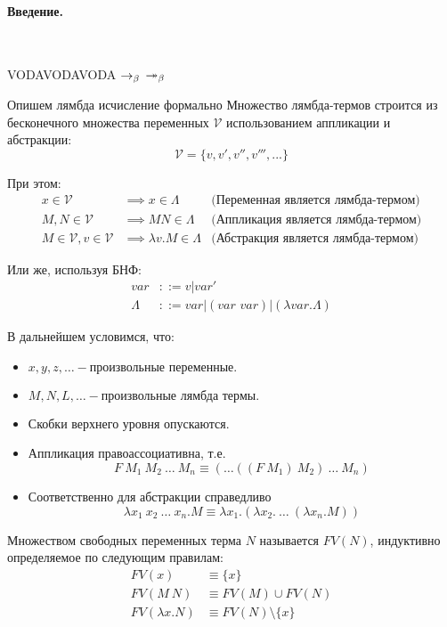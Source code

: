 \documentclass[lambda.tex]{subfiles}
\begin{document}
\paragraph{Введение.} ~\\

\begin{tcolorbox}
VODAVODAVODA
$\rightarrow_\beta$
$\twoheadrightarrow_\beta$
\end{tcolorbox}

Опишем лямбда исчисление формально
Множество лямбда-термов строится из бесконечного множества переменных $\mathcal{V}$ использованием аппликации и абстракции:
\[\mathcal{V} = \{ v, v', v'', v''', ... \}\]

При этом:
\begin{align*}
x \in \mathcal{V} & \implies x \in \Lambda & \text{(Переменная является лямбда-термом)}\\
M, N \in \mathcal{V} & \implies M N \in \Lambda & \text{(Аппликация является лямбда-термом)}\\
M \in \mathcal{V}, v \in \mathcal{V} & \implies \lambda v.M \in \Lambda & \text{(Абстракция является лямбда-термом)}
\end{align*}

Или же, используя БНФ:
\begin{align*}
var &::= v|var'\\
\Lambda &::= var | (\textit{var var}) | ( \lambda var . \Lambda )
\end{align*}

В дальнейшем условимся, что:
\begin{itemize}
\item\(x,y,z,\dots - \text{произвольные переменные.}\)
\item\(M,N,L,\dots - \text{произвольные лямбда термы.}\)
\item Скобки верхнего уровня опускаются.
\item Аппликация правоассоциативна, т.е.\\
\[F\ M_1 \ M_2 \ \dots\ M_n \equiv (\dots((F\ M_1)\ M_2)\ \dots\ M_n)\]
\item Соответственно для абстракции справедливо
\[\lambda x_1 \ x_2 \ \dots\ x_n .M \equiv \lambda x_1 .(\lambda x_2 .\ \dots\ (\lambda x_n .M))\]
\end{itemize}

Множеством свободных переменных терма $N$ называется $FV(N)$, индуктивно определяемое по следующим правилам:
\begin{align*}
FV(x) &\equiv \{x\}\\
FV(M\ N) &\equiv FV(M)\cup FV(N)\\
FV(\lambda x.N) &\equiv FV(N)\setminus\{x\}
\end{align*}
\end{document}
